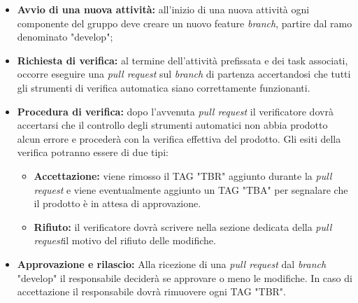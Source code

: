 	\begin{itemize}
		\item \textbf{Avvio di una nuova attività: } all’inizio di una nuova attività ogni componente del gruppo
		deve creare un nuovo feature \textit{branch\glos}, partire dal ramo denominato "develop";
		\item \textbf{Richiesta di verifica: } al termine dell'attività prefissata e dei task associati, occorre eseguire una \textit{pull request\glo} sul \textit{branch\glo} di partenza accertandosi che tutti gli strumenti di verifica automatica siano correttamente funzionanti. 
		\item \textbf{Procedura di verifica:} dopo l'avvenuta \textit{pull request\glo} il verificatore dovrà accertarsi che il controllo degli strumenti automatici non abbia prodotto alcun errore e procederà con la verifica effettiva del prodotto. Gli esiti della verifica potranno essere di due tipi:
		\begin{itemize}
			\item \textbf{Accettazione:} viene rimosso il TAG "TBR" aggiunto durante la \textit{pull request\glo} e viene eventualmente aggiunto un TAG "TBA" per segnalare che il prodotto è in attesa di approvazione.
			\item \textbf{Rifiuto:} il verificatore dovrà scrivere nella sezione dedicata della
			\textit{pull request}\glo il motivo del rifiuto delle modifiche.
		\end{itemize} 
		\item \textbf{Approvazione e rilascio:} Alla ricezione di una \textit{pull request\glo} dal \textit{branch\glo} "develop" il responsabile deciderà se approvare o meno le modifiche. In caso di accettazione il responsabile dovrà rimuovere ogni TAG "TBR".
	\end{itemize}


